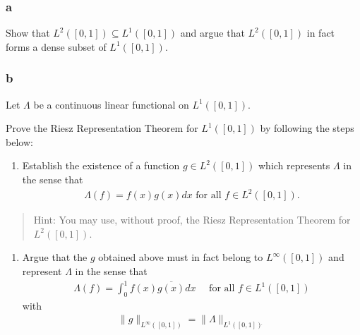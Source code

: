 \hypertarget{a-16}{%
\subsubsection{a}\label{a-16}}

Show that \(L^2([0, 1]) ⊆ L^1([0, 1])\) and argue that \(L^2([0, 1])\)
in fact forms a dense subset of \(L^1([0, 1])\).

\hypertarget{b-15}{%
\subsubsection{b}\label{b-15}}

Let \(Λ\) be a continuous linear functional on \(L^1([0, 1])\).

Prove the Riesz Representation Theorem for \(L^1([0, 1])\) by following
the steps below:

\begin{enumerate}
\def\labelenumi{\roman{enumi}.}
\tightlist
\item
  Establish the existence of a function \(g ∈ L^2([0, 1])\) which
  represents \(Λ\) in the sense that
  \begin{align*}
    Λ(f ) = f (x)g(x) dx \text{ for all } f ∈ L^2([0, 1]).
    \end{align*}
\end{enumerate}

\begin{quote}
Hint: You may use, without proof, the Riesz Representation Theorem for
\(L^2([0, 1])\).
\end{quote}

\begin{enumerate}
\def\labelenumi{\roman{enumi}.}
\setcounter{enumi}{1}
\tightlist
\item
  Argue that the \(g\) obtained above must in fact belong to
  \(L^∞([0, 1])\) and represent \(Λ\) in the sense that
  \begin{align*}
    \Lambda(f)=\int_{0}^{1} f(x) \overline{g(x)} d x \quad \text { for all } f \in L^{1}([0,1])
    \end{align*}
  with
  \begin{align*}
    \|g\|_{L^{\infty}([0,1])} = \|\Lambda\|_{L^{1}([0,1]) {}^{ \check{} }}
    \end{align*}
\end{enumerate}

